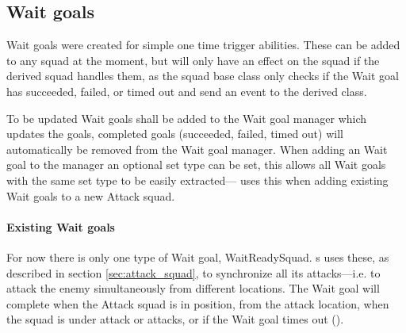 \subsection{Wait goals}
\label{sec:wait_goals}
Wait goals were created for simple one time trigger abilities. These can be added to any squad at
the moment, but will only have an effect on the squad if the derived squad handles them, as the
squad base class only checks if the Wait goal has succeeded, failed, or timed out and send an event
to the derived class.

To be updated Wait goals shall be added to the Wait goal manager which updates the goals, completed
goals (succeeded, failed, timed out) will automatically be removed from the Wait goal manager. When
adding an Wait goal to the manager an optional set type can be set, this allows all Wait goals with
the same set type to be easily extracted— uses this when adding
existing Wait goals to a new Attack squad.

\paragraph{Existing Wait goals}
For now there is only one type of Wait goal, WaitReadySquad. s uses these,
as described in section \ref{sec:attack_squad}, to synchronize all its attacks—i.e. to attack the
enemy simultaneously from different locations. The Wait goal will complete when the Attack squad is
in position, \squadAttackWaitingPositionDistanceFromGoal from the attack location, when the squad is
under attack or attacks, or if the Wait goal times out (\attackCoordinatorWaitGoalTimeout).
